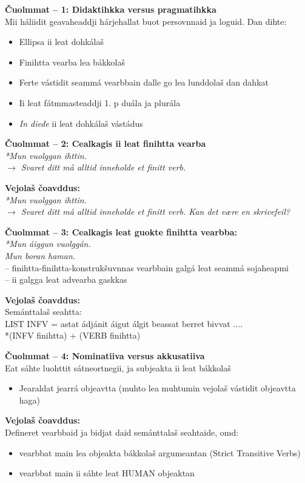 \documentclass[landscape,norsk,11pt]{seminar}
\begin{document}
\begin{slide}
\newslide
\textbf{Čuolmmat -- 1: Didaktihkka versus pragmatihkka} \\
Mii háliidit geavaheaddji hárjehallat buot persovnnaid ja loguid. Dan dihte:
\begin{itemize}
\item{Ellipsa ii leat dohkálaš}
\item{Finihtta vearba lea bákkolaš}
\item{Ferte vástidit seammá vearbbain dalle go lea lunddolaš dan dahkat}
\item{Ii leat fátmmasteaddji 1. p duála ja plurála }
\item{\textit{In dieđe} ii leat dohkálaš vástádus}
\end{itemize}

\newslide
\textbf{Čuolmmat -- 2: Cealkagis ii leat finihtta vearba} \\

\textit{*Mun vuolggan ihttin.}\\
\textit{$\rightarrow$ Svaret ditt må alltid inneholde et finitt verb.} 

\newslide
\textbf{Vejolaš čoavddus:}\\

\textit{*Mun vuolggan ihttin.}\\
\textit{$\rightarrow$ Svaret ditt må alltid inneholde et finitt verb. Kan det være en skrivefeil?}


\newslide
\textbf{Čuolmmat -- 3: Cealkagis leat guokte finihtta vearbba:} \\

\textit{*Mun áiggun vuolggán.}\\
\textit{Mun boran haman.}\\
-- finihtta-finihtta-konstrukšuvnnas vearbbain galgá leat seammá sojaheapmi\\
-- ii galgga leat advearba gaskkas

\newslide
\textbf{Vejolaš čoavddus:} \\
Semánttalaš seahtta:\\
LIST INFV =  astat ádjánit áigut álgit beassat berret bivvat .... \\
\textnormal{*(INFV finihtta) + (VERB finihtta)}


\newslide
\textbf{Čuolmmat -- 4: Nominatiiva versus akkusatiiva} \\
Eat sáhte luohttit sátneortnegii, ja subjeakta ii leat bákkolaš
\begin{itemize}
\item Jearaldat jearrá objeavtta (muhto lea muhtumin vejolaš vástidit objeavtta haga)
\end{itemize}
\newslide
\textbf{Vejolaš čoavddus:} \\
Defineret vearbbaid ja bidjat daid semánttalaš seahtaide, omd: 
\begin{itemize}
\item vearbbat main lea objeakta bákkolaš argumeantan  (Strict Transitive Verbs)
\item vearbbat main ii sáhte leat HUMAN objeaktan 
\end{itemize}


\end{slide}
\end{document}
